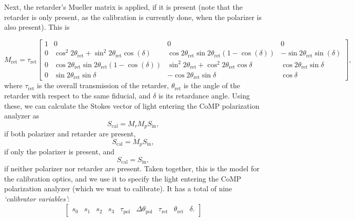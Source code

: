 \documentclass[11pt]{article}
\begin{document}
Next, the retarder's Mueller matrix is applied, if it is present (note that the retarder is only present, as the calibration is currently done, when the polarizer is also present). This is

\begin{equation}
	M_{\mathrm{ret}} = \tau_{\mathrm{ret}}
	\begin{bmatrix}
		1 & 0 & 0 & 0 \\
		0 & \cos^2{2\theta_{\mathrm{ret}}}+\sin^2{2\theta_{\mathrm{ret}}}\cos(\delta) & \cos{2\theta_{\mathrm{ret}}}\sin{2\theta_{\mathrm{ret}}}(1-\cos(\delta)) & -\sin{2\theta_{\mathrm{ret}}}\sin(\delta) \\
		0 & \cos{2\theta_{\mathrm{ret}}}\sin{2\theta_{\mathrm{ret}}}(1-\cos(\delta)) & \sin^2{2\theta_{\mathrm{ret}}}+\cos^2{2\theta_{\mathrm{ret}}}\cos{\delta} & \cos{2\theta_{\mathrm{ret}}}\sin{\delta} \\
		0 & \sin{2\theta_{\mathrm{ret}}}\sin{\delta} & -\cos{2\theta_{\mathrm{ret}}}\sin{\delta} & \cos{\delta}
	\end{bmatrix},
\end{equation}
where $\tau_{\mathrm{ret}}$ is the overall transmission of the retarder, $\theta_{\mathrm{ret}}$ is the angle of the retarder with respect to the same fiducial, and $\delta$ is its retardance angle. Using these, we can calculate the Stokes vector of light entering the CoMP polarization analyzer as
\begin{equation}
	S_{\mathrm{cal}} = M_{r}M_{p}S_{\mathrm{in}},
\end{equation}
if both polarizer and retarder are present,
\begin{equation}
	S_{\mathrm{cal}} = M_{p}S_{\mathrm{in}},
\end{equation}
if only the polarizer is present, and
\begin{equation}
	S_{\mathrm{cal}} = S_{\mathrm{in}},
\end{equation}
if neither polarizer nor retarder are present. Taken together, this is the model for the calibration optics, and we use it to specify the light entering the CoMP polarization analyzer (which we want to calibrate). It has a total of nine {\em `calibrator variables'}:
\begin{equation}\label{eq:calvariables}
	\begin{bmatrix}
		s_0 & s_1 & s_2 & s_3 & \tau_{\mathrm{pol}} & \Delta\theta_{\mathrm{pol}} & \tau_{\mathrm{ret}} & \theta_{\mathrm{ret}} & \delta.
	\end{bmatrix}
\end{equation}
\end{document}
